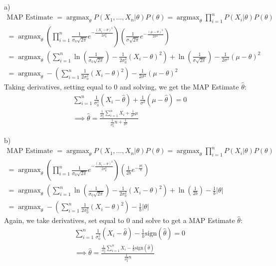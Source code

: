 \documentclass[12pt]{article}
\theoremstyle{plain}
\theoremstyle{definition}
\DeclareMathOperator{\argmax}{argmax}
\begin{document}
\begin{enumerate}
a) 
\begin{align*}
\text{MAP Estimate } = \argmax_{\theta} P(X_1, ..., X_n | \theta)P(\theta) = \argmax_{\theta} \prod_{i=1}^n P(X_i|\theta)P(\theta) \\
= \argmax_{\theta} (\prod_{i=1}^n \frac{1}{\sigma_0 \sqrt{2 \pi}} e^{-\frac{(X_i - \theta)^2}{2\sigma_0^2}}) (\frac{1}{\sigma \sqrt{2 \pi}} e^{-\frac{(\mu - \theta)^2}{2\sigma^2}}) \\
= \argmax_{\theta} (\sum_{i=1}^n \ln(\frac{1}{\sigma_0 \sqrt{2 \pi}}) - \frac{1}{2\sigma_0^2}(X_i - \theta)^2) + \ln(\frac{1}{\sigma \sqrt{2 \pi}}) - \frac{1}{2\sigma^2}(\mu - \theta)^2 \\
= \argmax_{\theta} -(\sum_{i=1}^n \frac{1}{2\sigma_0^2}(X_i - \theta)^2) - \frac{1}{2\sigma^2}(\mu - \theta)^2
\end{align*}
Taking derivatives, setting equal to 0 and solving, we get the MAP Estimate $\hat \theta$:
\begin{align*}
\sum_{i=1}^n \frac{1}{\sigma_0^2}(X_i - \hat \theta) + \frac{1}{\sigma^2}(\mu - \hat \theta) = 0 \\
\implies \hat \theta = \frac{ \frac{1}{\sigma_0^2} \sum_{i=1}^n X_i + \frac{1}{\sigma^2}\mu }{\frac{1}{\sigma_0^2}n + \frac{1}{\sigma^2}}
\end{align*}

b)
\begin{align*}
\text{MAP Estimate } = \argmax_{\theta} P(X_1, ..., X_n | \theta)P(\theta) = \argmax_{\theta} \prod_{i=1}^n P(X_i|\theta)P(\theta) \\
= \argmax_{\theta} (\prod_{i=1}^n \frac{1}{\sigma_0 \sqrt{2 \pi}} e^{-\frac{(X_i - \theta)^2}{2\sigma_0^2}}) (\frac{1}{2b} e^{-\frac{|\theta|}{b}}) \\
= \argmax_{\theta} (\sum_{i=1}^n \ln(\frac{1}{\sigma_0 \sqrt{2 \pi}}) - \frac{1}{2\sigma_0^2}(X_i - \theta)^2) + \ln(\frac{1}{2b}) - \frac{1}{b}|\theta| \\
= \argmax_{\theta} -(\sum_{i=1}^n \frac{1}{2\sigma_0^2}(X_i - \theta)^2) - \frac{1}{b}|\theta|
\end{align*}
Again, we take derivatives, set equal to 0 and solve to get a MAP Estimate $\hat \theta$:
\begin{align*}
\sum_{i=1}^n \frac{1}{\sigma_0^2}(X_i - \hat \theta) - \frac{1}{b} \text{sign}(\hat\theta) = 0 \\
\implies \hat \theta = \frac{ \frac{1}{\sigma_0^2} \sum_{i=1}^n X_i - \frac{1}{b}\text{sign}(\hat\theta) }{ \frac{1}{\sigma_0^2}n}
\end{align*}


\end{enumerate}
\end{document}
